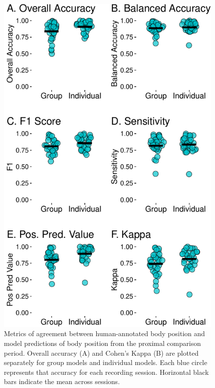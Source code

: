 \documentclass[
  man]{apa6}
\begin{document}
\begin{figure}

{\centering \includegraphics{manuscript_files/figure-latex/metrics-1} 

}

\caption{Metrics of agreement between human-annotated body position and model predictions of body position from the proximal comparison period. Overall accuracy (A) and Cohen's Kappa (B) are plotted separately for group models and individual models. Each blue circle represents that accuracy for each recording session. Horizontal black bars indicate the mean across sessions.}\label{fig:metrics}
\end{figure}
\end{document}
